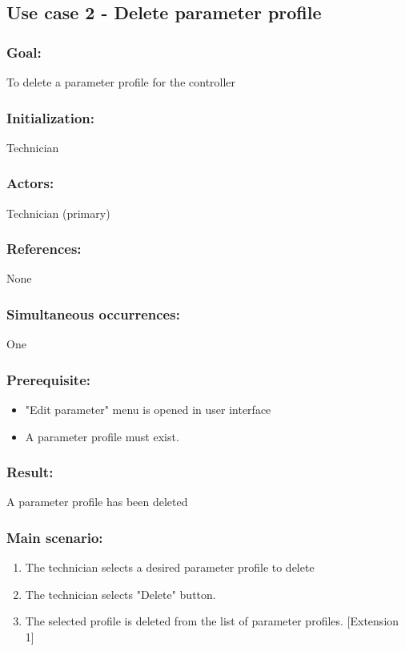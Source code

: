 \begin{framed}
	\subsection{Use case 2 - Delete parameter profile}
	\subsubsection*{Goal:}
	To delete a parameter profile for the controller
	
	\subsubsection*{Initialization:}
	Technician
	
	\subsubsection*{Actors:}
	Technician (primary)
	
	\subsubsection*{References:}
	None
	
	\subsubsection*{Simultaneous occurrences:}
	One
	
	\subsubsection*{Prerequisite:}
	\begin{itemize}
		\item "Edit parameter" menu is opened in user interface
		\item A parameter profile must exist.
	\end{itemize}
	
	\subsubsection*{Result:}
	A parameter profile has been deleted
	
	\subsubsection*{Main scenario:}
	\begin{enumerate}
		\item The technician selects a desired parameter profile to delete
		\item The technician selects "Delete" button.
		\item The selected profile is deleted from the list of parameter profiles. [Extension 1]
	\end{enumerate}	
	

\end{framed}
